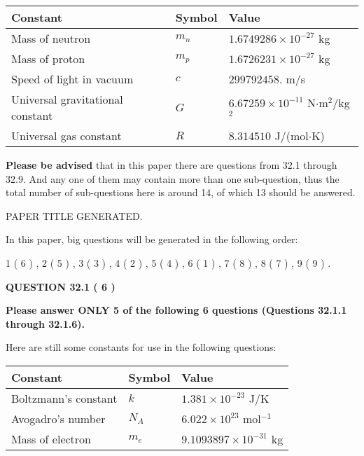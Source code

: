 \documentclass[12pt]{article}
\begin{document}
 
\noindent\begin{tabular}{|l|l|l|}
\hline
Constant & Symbol & Value \\
\hline
Mass of neutron &
$m_n$ &
 $ 1.6749286 \times 10^{-27} $
kg \\
\hline
Mass of proton &
$m_p$ &
 $ 1.6726231 \times 10^{-27} $
kg \\
\hline
Speed of light in vacuum &
$c$ &
 $ 299792458. $
m/s \\
\hline
Universal gravitational constant &
$G$ &
 $ 6.67259 \times 10^{-11} $
N$\cdot $m$^2$/kg$^2$ \\
\hline
Universal gas constant &
$R$ &
 $ 8.314510 $
J/(mol$\cdot $K) \\
\hline
\end{tabular}
 
 
{\textbf{\large{Please be advised}}} that in this paper there are questions from
32.1 through
32.9.
And any one of them may contain more than one sub-question, thus the total number
of sub-questions here is around 14, of which
13 should be answered.
 
\vspace{0.3in}
 
 
   
   
 PAPER TITLE GENERATED.
   
   
   
\vspace{0.2in}
   
In this paper, big questions will be generated in the following order: 
   
   
             1 (           6 )
 ,
             2 (           5 )
 ,
             3 (           3 )
 ,
             4 (           2 )
 ,
             5 (           4 )
 ,
             6 (           1 )
 ,
             7 (           8 )
 ,
             8 (           7 )
 ,
             9 (           9 )
 .
  
\vspace{0.2in}
  
{\textbf{\Large{QUESTION
32.1 
 (           6 )
}}}
  
  
 
{\textbf{\Large{Please answer ONLY
5 of the following
6 questions (Questions
32.1.1 through
32.1.6). }}}
 
Here are still some constants for use in the following questions:
 
 
\noindent\begin{tabular}{|l|l|l|}
\hline
Constant & Symbol & Value \\
\hline
 
Boltzmann's constant &
$k$ &
 $ 1.381 \times 10^{-23} $
J/K \\
\hline
 
Avogadro's number &
$N_A$ &
 $ 6.022 \times 10^{23} $
mol$^{-1}$ \\
\hline
 
Mass of electron &
$m_e$ &
 $ 9.1093897 \times 10^{-31} $
kg \\
\hline
 
\end{tabular}
 
\end{document}
